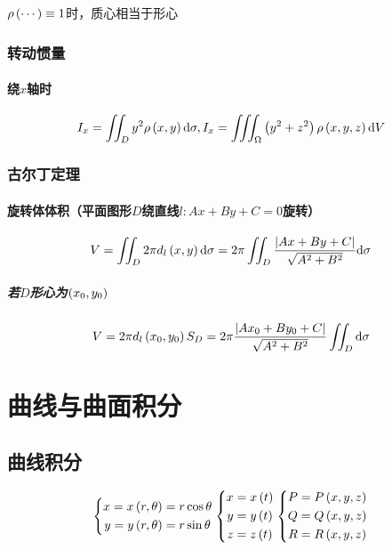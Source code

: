 \documentclass{article}
\begin{document}
$\rho\left(\cdots\right)\equiv1$时，质心相当于形心

\subsubsection{转动惯量}

\paragraph{绕$x$轴时}

\[I_x=\iint_Dy^2\rho\left(x,y\right)\mathrm d\sigma,
    I_x=\iiint_\Omega\left(y^2+z^2\right)\rho\left(x,y,z\right)\mathrm d V\]

\subsubsection{古尔丁定理}

\paragraph{旋转体体积（平面图形$D$绕直线$l:Ax+By+C=0$旋转）}

\[V=\iint_D2\pi d_l\left(x,y\right)\mathrm d\sigma=2\pi\iint_D\frac{\left|Ax+By+C\right|}{\sqrt{A^2+B^2}}\mathrm d\sigma\]

\subparagraph{若$D$形心为$\left(x_0,y_0\right)$}

\[V=2\pi d_l\left(x_0,y_0\right)S_D=2\pi\frac{\left|Ax_0+By_0+C\right|}{\sqrt{A^2+B^2}}\iint_D\mathrm d\sigma\]


\section{曲线与曲面积分}

\subsection{曲线积分}

\begin{definition}[]
    \[\left\{\begin{aligned}
            x=x\left(r,\theta\right) & =r\cos\theta \\
            y=y\left(r,\theta\right) & =r\sin\theta
        \end{aligned}\right.
        \left\{\begin{aligned}
            x & =x\left(t\right) \\
            y & =y\left(t\right) \\
            z & =z\left(t\right)
        \end{aligned}\right.
        \left\{\begin{aligned}
            P & =P\left(x,y,z\right) \\
            Q & =Q\left(x,y,z\right) \\
            R & =R\left(x,y,z\right)
        \end{aligned}\right.\]
\end{definition}
\end{document}
